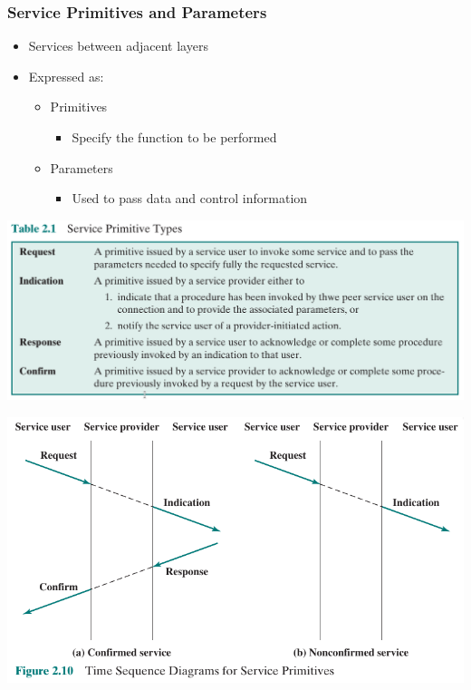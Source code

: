 \documentclass[pdflatex,compress]{beamer}
\begin{document}
\begin{frame}
	\frametitle{Service Primitives and Parameters}
	\begin{itemize}
		\item Services between adjacent layers
		\item Expressed as:
		\begin{itemize}
			\item Primitives
			\begin{itemize}
				\item Specify the function to be performed
			\end{itemize}
			\item Parameters
			\begin{itemize}
				\item Used to pass data and control information
			\end{itemize}
		\end{itemize}
	\end{itemize}
\end{frame}

\begin{frame}
	\begin{center}
		\includegraphics[width=\linewidth]{img/img11}
	\end{center}
\end{frame}

\begin{frame}
	\begin{center}
		\includegraphics[width=\linewidth]{img/img12}
	\end{center}
\end{frame}
\end{document}
